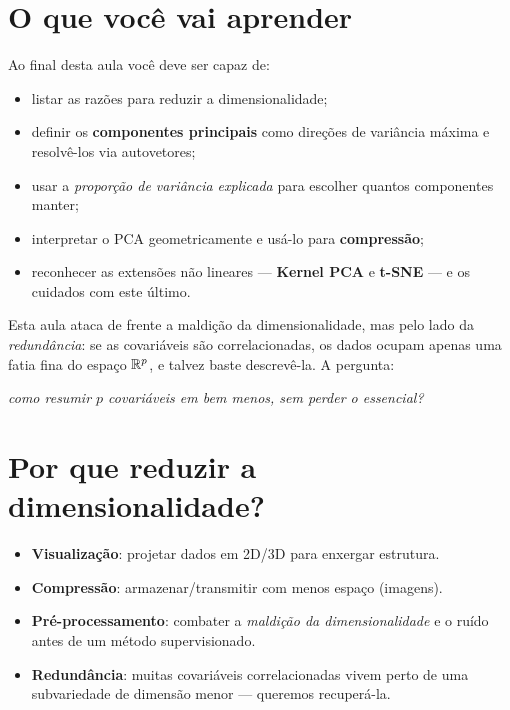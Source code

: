 \documentclass[11pt,a4paper]{article}
\title{}
\date{}
\begin{document}

\section*{O que você vai aprender}
Ao final desta aula você deve ser capaz de:
\begin{itemize}[leftmargin=1.4cm]
  \item listar as razões para reduzir a dimensionalidade;
  \item definir os \textbf{componentes principais} como direções de variância
        máxima e resolvê-los via autovetores;
  \item usar a \emph{proporção de variância explicada} para escolher quantos
        componentes manter;
  \item interpretar o PCA geometricamente e usá-lo para \textbf{compressão};
  \item reconhecer as extensões não lineares --- \textbf{Kernel PCA} e
        \textbf{t-SNE} --- e os cuidados com este último.
\end{itemize}

\noindent
Esta aula ataca de frente a maldição da dimensionalidade, mas pelo lado
da \emph{redundância}: se as covariáveis são correlacionadas, os dados ocupam
apenas uma fatia fina do espaço $\mathbb{R}^p$, e talvez baste descrevê-la. A pergunta:

\begin{center}\itshape
  como resumir $p$ covariáveis em bem menos, sem perder o essencial?
\end{center}

\section{Por que reduzir a dimensionalidade?}
\begin{itemize}[leftmargin=1.4cm,nosep]
  \item \textbf{Visualização}: projetar dados em 2D/3D para enxergar estrutura.
  \item \textbf{Compressão}: armazenar/transmitir com menos espaço (imagens).
  \item \textbf{Pré-processamento}: combater a \emph{maldição da dimensionalidade}
        e o ruído antes de um método supervisionado.
  \item \textbf{Redundância}: muitas covariáveis correlacionadas vivem perto de uma
        subvariedade de dimensão menor --- queremos recuperá-la.
\end{itemize}
\end{document}
